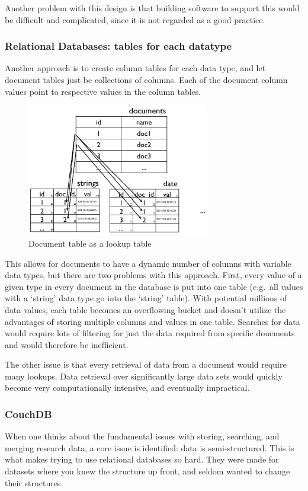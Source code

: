Another problem with this design is that building software to support this would
be difficult and complicated, since it is not regarded as a good practice.


\subsubsection{Relational Databases: tables for each datatype}
Another approach is to create column tables for each data type, and let document 
tables just be collections of columns. Each of the document column values point to 
respective values in the column tables.

\begin{figure}[h]
	\begin{center}
	\includegraphics[width=80mm]{images/rel_db_lookup}
	\caption{Document table as a lookup table} 
	\label{rel_db_lookup}
	\end{center}
\end{figure}

This allows for documents to have a dynamic number of columns with variable data types,
but there are two problems with this approach. First, every value of a given type in every document
in the database is put into one table (e.g.\ all values with a `string' data type
go into the `string' table). With potential millions of data values, each table
becomes an overflowing bucket and doesn't utilize the advantages of storing multiple
columns and values in one table. Searches for data would require lots of filtering 
for just the data required from specific doucments and would therefore be inefficient.

The other issue is that every retrieval of data from a document would require
many lookups. Data retrieval over significantly large data sets would quickly become
very computationally intensive, and eventually  impractical.


\subsubsection{CouchDB}
When one thinks about the fundamental issues with storing, searching, and merging 
research data, a core issue is identified: data is semi-structured. This is what
makes trying to use relational databases so hard. They were made for datasets where
you knew the structure up front, and seldom wanted to change their structures.

